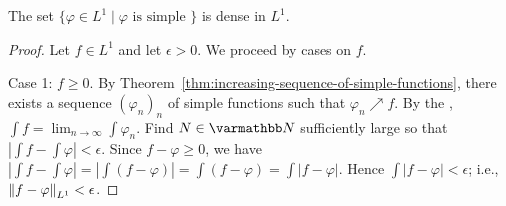 \begin{theorem}\label{thm:simple-dense-in-l1}
    The set $\{\varphi \in L^1 \mid \varphi \text{ is simple }\}$ is dense in $L^1$.
\end{theorem}
    \begin{proof}
        Let $f \in L^1$ and let $\epsilon > 0$. We proceed by cases on $f$. 
        
        Case 1: $f \geq 0$. By Theorem~\ref{thm:increasing-sequence-of-simple-functions}, there exists a sequence $(\varphi_n)_n$ of simple functions such that $\varphi_n \nearrow f$. By the , $\int f = \lim_{n \rightarrow \infty}\int \varphi_n$. Find $N \in \bfN$ sufficiently large so that $ \left| \int f - \int \varphi \right| < \epsilon$. Since $f - \varphi \geq 0$, we have $\left| \int f - \int \varphi \right| = \left| \int (f - \varphi) \right| = \int (f-\varphi) = \int \left| f - \varphi \right|$. Hence $\int |f - \varphi| < \epsilon$; i.e., $\left\lVert f- \varphi \right\rVert_{L^1} < \epsilon$.


\end{proof}
